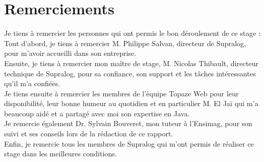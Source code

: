 \newpage
\section*{Remerciements}

Je tiens à remercier les personnes qui ont permis le bon déroulement de ce stage : \\

Tout d'abord, je tiens à remercier M. Philippe Salvan, directeur de Supralog, pour m'avoir accueilli dans son entreprise.\\

Ensuite, je tiens à remercier mon ma\^itre de stage, M. Nicolas Thibault, directeur technique de Supralog, pour sa confiance, son support et les tâches intéressantes qu'il m'a confiées.\\

Je tiens ensuite à remercier les membres de l'équipe Topaze Web pour leur disponibilité, leur bonne humeur au quotidien et en particulier M. El Jaï qui m'a beaucoup aidé et a partagé avec moi son expertise en Java.\\

Je remercie également Dr. Sylvain Bouveret, mon tuteur à l'Ensimag, pour son suivi et ses conseils lors de la rédaction de ce rapport.\\

Enfin, je remercie tous les membres de Supralog qui m'ont permis de réaliser ce stage dans les meilleures conditions.
